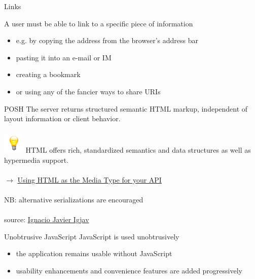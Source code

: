 \documentclass{beamer}
\begin{document}
\begin{frame}{Links}

  A user must be able to link to a specific piece of information

  \begin{itemize}
    \item e.g. by copying the address from the browser's address bar
    \item pasting it into an e-mail or IM
    \item creating a bookmark
    \item or using any of the fancier ways to share URIs
  \end{itemize}
\end{frame}

\begin{frame}{POSH}
  The server returns structured semantic HTML markup, independent of layout information or client behavior.
  \\~\\

  \includegraphics[width=1cm]{images/bulb.png}
  HTML offers rich, standardized semantics and data structures as well as hypermedia support.
  \\~\\

  \ensuremath{\rightarrow}
  \href{http://codeartisan.blogspot.de/2012/07/using-html-as-media-type-for-your-api.html}{Using HTML as the Media Type for your API}
  \\~\\

  NB: alternative serializations are encouraged
  \\~\\

  \tiny source: \href{http://commons.wikimedia.org/wiki/File:Bombilla_amarilla_-_yellow_Edison_lamp.svg}{Ignacio Javier Igjav}
\end{frame}

\begin{frame}{Unobtrusive JavaScript}
  JavaScript is used unobtrusively

  \begin{itemize}
    \item the application remains usable without JavaScript
    \item usability enhancements and convenience features are added progressively
  \end{itemize}
\end{frame}
\end{document}

